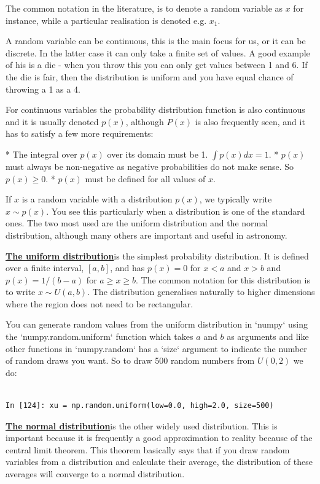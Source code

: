 \documentclass[a4paper,10pt]{article}
\begin{document}
The common notation in the literature, is to denote a random variable as $x$ for instance, while a particular realisation is denoted e.g. $x_1$.

A random variable can be continuous, this is the main focus for us, or it can be discrete. In the latter case it can only take a finite set of values. A good example of his is a die - when you throw this you can only get values between 1 and 6. If the die is fair, then the distribution is uniform and you have equal chance of throwing a 1 as a 4.

For continuous variables the probability distribution function is also continuous and it is usually denoted $p(x)$, although $P(x)$ is also frequently seen, and it has to satisfy a few more requirements:

* The integral over $p(x)$ over its domain must be 1. $\int p(x) dx = 1$.
* $p(x)$ must always be non-negative as negative probabilities do not make sense. So $p(x)\ge 0$.
* $p(x)$ must be defined for all values of $x$.

If $x$ is a random variable with a distribution $p(x)$, we typically write $x\sim p(x)$. You see this particularly when a distribution is one of the standard ones. The two most used are the uniform distribution and the normal distribution, although many others are important and useful in astronomy. 


\href{https://en.wikipedia.org/wiki/Uniform_distribution_(continuous)}{\textbf{The uniform distribution}}is the simplest probability distribution. It is defined over a finite interval, $[a, b]$, and has $p(x)=0$ for $x<a$ and $x>b$ and $p(x) = 1/(b-a)$ for $a\ge x \ge b$. The common notation for this distribution is to write $x\sim U(a, b)$. The distribution generalises naturally to higher dimensions where the region does not need to be rectangular.

You can generate random values from the uniform distribution in `numpy` using the `numpy.random.uniform` function which takes $a$ and $b$ as arguments and like other functions in `numpy.random` has a `size` argument to indicate the number of random draws you want. So to draw 500 random numbers from $U(0, 2)$ we do:
\begin{lstlisting}

In [124]: xu = np.random.uniform(low=0.0, high=2.0, size=500)
\end{lstlisting}



\href{https://en.wikipedia.org/wiki/Normal_distribution}{\textbf{The normal distribution}}is the other widely used distribution. This is important because it is frequently a good approximation to reality because of the central limit theorem. This theorem basically says that if you draw random variables from a distribution and calculate their average, the distribution of these averages will converge to a normal distribution.
\end{document}
